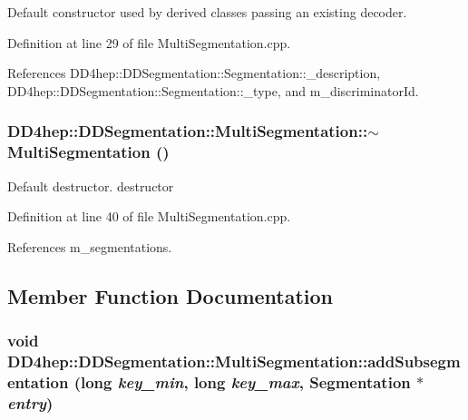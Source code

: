 Default constructor used by derived classes passing an existing decoder. 

Definition at line 29 of file MultiSegmentation.cpp.

References DD4hep::DDSegmentation::Segmentation::\_\-description, DD4hep::DDSegmentation::Segmentation::\_\-type, and m\_\-discriminatorId.\hypertarget{class_d_d4hep_1_1_d_d_segmentation_1_1_multi_segmentation_ac59d1f2a2145181f48c0c7ffdd13a5ba}{
\subsubsection[{$\sim$MultiSegmentation}]{\setlength{\rightskip}{0pt plus 5cm}DD4hep::DDSegmentation::MultiSegmentation::$\sim$MultiSegmentation ()}}
\label{class_d_d4hep_1_1_d_d_segmentation_1_1_multi_segmentation_ac59d1f2a2145181f48c0c7ffdd13a5ba}


Default destructor. destructor 

Definition at line 40 of file MultiSegmentation.cpp.

References m\_\-segmentations.

\subsection{Member Function Documentation}
\hypertarget{class_d_d4hep_1_1_d_d_segmentation_1_1_multi_segmentation_aa92e91f45ba11b074fd6cafb87e15325}{
\subsubsection[{addSubsegmentation}]{\setlength{\rightskip}{0pt plus 5cm}void DD4hep::DDSegmentation::MultiSegmentation::addSubsegmentation (long {\em key\_\-min}, \/  long {\em key\_\-max}, \/  {\bf Segmentation} $\ast$ {\em entry})}}
\label{class_d_d4hep_1_1_d_d_segmentation_1_1_multi_segmentation_aa92e91f45ba11b074fd6cafb87e15325}


